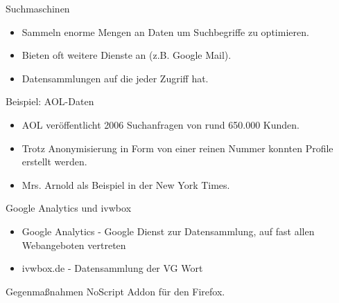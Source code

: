 \begin{frame}{Suchmaschinen}
	\begin{itemize}
		\item Sammeln enorme Mengen an Daten um Suchbegriffe zu optimieren.
		\item Bieten oft weitere Dienste an (z.B. Google Mail).
		\item Datensammlungen auf die jeder Zugriff hat.
	\end{itemize}
\end{frame}

\begin{frame}{Beispiel: AOL-Daten}
	\begin{itemize}
		\item AOL ver\"offentlicht 2006 Suchanfragen von rund 650.000 Kunden.
		\item Trotz Anonymisierung in Form von einer reinen Nummer konnten Profile erstellt werden.
		\item Mrs. Arnold als Beispiel in der New York Times.
	\end{itemize}
\end{frame}

\begin{frame}{Google Analytics und ivwbox}
	\begin{itemize}
		\item Google Analytics - Google Dienst zur Datensammlung, auf fast allen Webangeboten vertreten
		\item ivwbox.de - Datensammlung der VG Wort
	\end{itemize}
	\begin{block}{Gegenma\ss nahmen}
		NoScript Addon f\"ur den Firefox.
	\end{block}
\end{frame}

